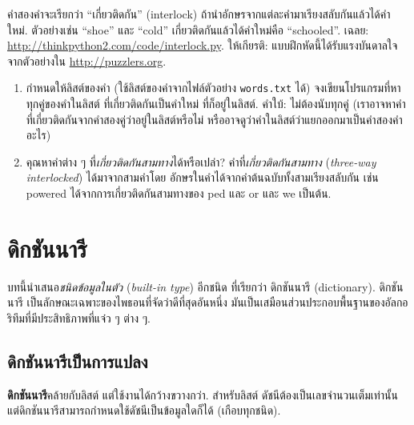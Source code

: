 \begin{exercise}

คำสองคำจะเรียกว่า ``เกี่ยวติดกัน'' (interlock) ถ้านำอักษรจากแต่ละคำมาเรียงสลับกันแล้วได้คำใหม่.
ตัวอย่างเช่น ``shoe'' และ ``cold''
เกี่ยวติดกันแล้วได้คำใหม่คือ ``schooled''.
เฉลย: \url{http://thinkpython2.com/code/interlock.py}.
ให้เกียรติ: แบบฝึกหัดนี้ได้รับแรงบันดาลใจจากตัวอย่างใน \url{http://puzzlers.org}.

\begin{enumerate}

\item กำหนดให้ลิสต์ของคำ (ใช้ลิสต์ของคำจากไฟล์ตัวอย่าง \texttt{words.txt} ได้) จงเขียนโปรแกรมที่หาทุกคู่ของคำในลิสต์ ที่เกี่ยวติดกันเป็นคำใหม่ ที่ก็อยู่ในลิสต์.
คำใบ้: ไม่ต้องนับทุกคู่ (เราอาจหาคำที่เกี่ยวติดกันจากคำสองคู่ว่าอยู่ในลิสต์หรือไม่ 
หรืออาจดูว่าคำในลิสต์ว่าแยกออกมาเป็นคำสองคำอะไร)

\item คุณหาคำต่าง ๆ ที่\textit{เกี่ยวติดกันสามทาง}ได้หรือเปล่า?
คำที่\textit{เกี่ยวติดกันสามทาง} (\textit{three-way interlocked}) ได้มาจากสามคำโดย
อักษรในคำได้จากคำต้นฉบับทั้งสามเรียงสลับกัน เช่น powered ได้จากการเกี่ยวติดกันสามทางของ ped และ or และ we เป็นต้น.

\end{enumerate}
\end{exercise}
\vspace{0.5cm}


\chapter{ดิกชันนารี}

บทนี้นำเสนอ\textit{ชนิดข้อมูลในตัว} (\textit{built-in type}) อีกชนิด ที่เรียกว่า ดิกชันนารี (dictionary).
ดิกชันนารี เป็นลักษณะเฉพาะของไพธอนที่จัดว่าดีที่สุดอันหนึ่ง
มันเป็นเสมือนส่วนประกอบพื้นฐานของอัลกอริทึมที่มีประสิทธิภาพที่แจ๋ว ๆ ต่าง ๆ.

\section{ดิกชันนารีเป็นการแปลง}


\textbf{ดิกชันนารี}คล้ายกับลิสต์ แต่ใช้งานได้กว้างขวางกว่า.
สำหรับลิสต์ ดัชนีต้องเป็นเลขจำนวนเต็มเท่านั้น
แต่ดิกชันนารีสามารถกำหนดใช้ดัชนีเป็นข้อมูลใดก็ได้ (เกือบทุกชนิด).


